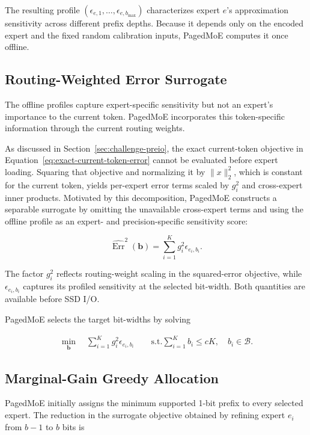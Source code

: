 \documentclass[sigconf, nonacm]{acmart}
\begin{document}
The resulting profile
\(
(\epsilon_{e,1},\ldots,\epsilon_{e,b_{\max}})
\)
characterizes expert \(e\)'s approximation sensitivity across
different prefix depths. Because it depends only on the encoded expert
and the fixed random calibration inputs, PagedMoE computes it once
offline.

\subsection{Routing-Weighted Error Surrogate}
\label{sec:error-surrogate}

The offline profiles capture expert-specific sensitivity but not an expert's
importance to the current token. PagedMoE incorporates this token-specific
information through the current routing weights.

As discussed in Section~\ref{sec:challenge-preio}, the exact current-token
objective in Equation~\ref{eq:exact-current-token-error} cannot be evaluated
before expert loading. Squaring that objective and normalizing it by
\(\|x\|_2^2\), which is constant for the current token, yields per-expert
error terms scaled by \(g_i^2\) and cross-expert inner products.
Motivated by this decomposition, PagedMoE constructs a separable surrogate
by omitting the unavailable cross-expert terms and using the offline profile
as an expert- and precision-specific sensitivity score:

\[
\widehat{\operatorname{Err}}^2(\mathbf{b})
=
\sum_{i=1}^{K}
g_i^2 \epsilon_{e_i,b_i}.
\]

The factor \(g_i^2\) reflects routing-weight scaling in the squared-error
objective, while \(\epsilon_{e_i,b_i}\) captures its profiled
sensitivity at the selected bit-width. Both quantities are available before
SSD I/O.

PagedMoE selects the target bit-widths by solving

\[
\begin{aligned}
\min_{\mathbf{b}}\quad
 \sum_{i=1}^{K} g_i^2\epsilon_{e_i,b_i} \quad \quad
\text{s.t.}
 \sum_{i=1}^{K} b_i \leq cK, \quad
 b_i\in\mathcal{B}.
\end{aligned}
\]

\subsection{Marginal-Gain Greedy Allocation}
\label{sec:marginal-gain-allocation}

PagedMoE initially assigns the minimum supported 1-bit prefix to every
selected expert. The reduction in the surrogate objective obtained by
refining expert \(e_i\) from \(b-1\) to \(b\) bits is
\end{document}
